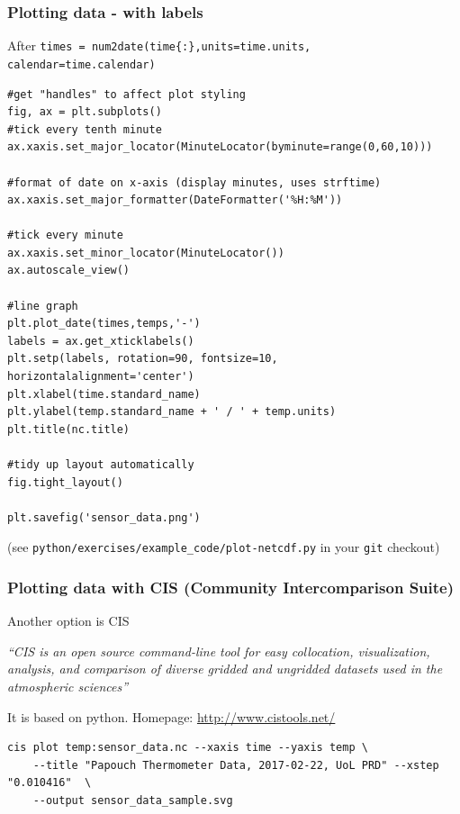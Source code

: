 \documentclass[aspectratio=1610,9pt]{beamer} %
\begin{document}
\begin{frame}[fragile]
\frametitle{Plotting data - with labels}

After
\texttt{times = num2date(time\{:\},units=time.units, calendar=time.calendar)}

\begin{verbatim}
#get "handles" to affect plot styling
fig, ax = plt.subplots()
#tick every tenth minute
ax.xaxis.set_major_locator(MinuteLocator(byminute=range(0,60,10)))

#format of date on x-axis (display minutes, uses strftime)
ax.xaxis.set_major_formatter(DateFormatter('%H:%M'))

#tick every minute
ax.xaxis.set_minor_locator(MinuteLocator())
ax.autoscale_view()

#line graph
plt.plot_date(times,temps,'-')
labels = ax.get_xticklabels()
plt.setp(labels, rotation=90, fontsize=10, horizontalalignment='center')
plt.xlabel(time.standard_name)
plt.ylabel(temp.standard_name + ' / ' + temp.units)
plt.title(nc.title)

#tidy up layout automatically
fig.tight_layout()

plt.savefig('sensor_data.png')
\end{verbatim}

(see \texttt{python/exercises/example\_code/plot-netcdf.py} in your
\texttt{git} checkout)

\end{frame}
\begin{frame}[fragile]
\frametitle{Plotting data with CIS (Community Intercomparison
Suite)}

Another option is CIS

\emph{``CIS is an open source command-line tool for easy collocation,
visualization, analysis, and comparison of diverse gridded and ungridded
datasets used in the atmospheric sciences''}

It is based on python. Homepage:
\href{http://www.cistools.net/}{http://www.cistools.net/}

\begin{verbatim}
cis plot temp:sensor_data.nc --xaxis time --yaxis temp \ 
    --title "Papouch Thermometer Data, 2017-02-22, UoL PRD" --xstep "0.010416"  \ 
    --output sensor_data_sample.svg
\end{verbatim}
\end{frame}
\end{document}
